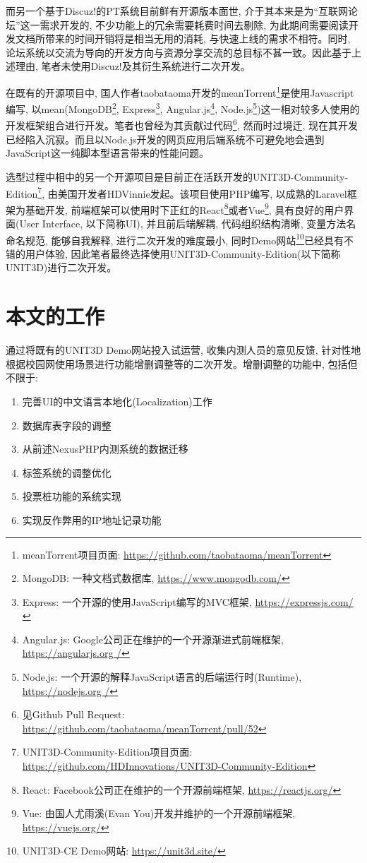而另一个基于Discuz!的PT系统目前鲜有开源版本面世, 介于其本来是为``互联网论坛''这一需求开发的, 不少功能上的冗余需要耗费时间去剔除, 为此期间需要阅读开发文档所带来的时间开销将是相当无用的消耗, 与快速上线的需求不相符。同时, 论坛系统以交流为导向的开发方向与资源分享交流的总目标不甚一致。因此基于上述理由, 笔者未使用Discuz!及其衍生系统进行二次开发。

在既有的开源项目中, 国人作者taobataoma开发的meanTorrent\footnote{meanTorrent项目页面: \url{https://github.com/taobataoma/meanTorrent}}是使用Javascript编写, 以mean(MongoDB\footnote{MongoDB: 一种文档式数据库, \url{https://www.mongodb.com/}}, Express\footnote{Express: 一个开源的使用JavaScript编写的MVC框架, \url{https://expressjs.com/}}, Angular.js\footnote{Angular.js: Google公司正在维护的一个开源渐进式前端框架, \url{https://angularjs.org
/}}, Node.js\footnote{Node.js: 一个开源的解释JavaScript语言的后端运行时(Runtime), \url{https://nodejs.org
/}})这一相对较多人使用的开发框架组合进行开发。笔者也曾经为其贡献过代码\footnote{见Github Pull Request: \url{https://github.com/taobataoma/meanTorrent/pull/52}}, 然而时过境迁, 现在其开发已经陷入沉寂。而且以Node.js开发的网页应用后端系统不可避免地会遇到JavaScript这一纯脚本型语言带来的性能问题。

选型过程中相中的另一个开源项目是目前正在活跃开发的UNIT3D-Community-Edition\footnote{UNIT3D-Community-Edition项目页面: \url{https://github.com/HDInnovations/UNIT3D-Community-Edition}}, 由美国开发者HDVinnie发起。该项目使用PHP编写, 以成熟的Laravel框架为基础开发, 前端框架可以使用时下正红的React\footnote{React: Facebook公司正在维护的一个开源前端框架, \url{https://reactjs.org/}}或者Vue\footnote{Vue: 由国人尤雨溪(Evan You)开发并维护的一个开源前端框架, \url{https://vuejs.org/}
}, 具有良好的用户界面(User Interface, 以下简称UI), 并且前后端解耦, 代码组织结构清晰, 变量方法名命名规范, 能够自我解释, 进行二次开发的难度最小, 同时Demo网站\footnote{UNIT3D-CE Demo网站: \url{https://unit3d.site/}}已经具有不错的用户体验, 因此笔者最终选择使用UNIT3D-Community-Edition(以下简称UNIT3D)进行二次开发。

\section{本文的工作}

通过将既有的UNIT3D Demo网站投入试运营, 收集内测人员的意见反馈, 针对性地根据校园网使用场景进行功能增删调整等的二次开发。增删调整的功能中, 包括但不限于:

\begin{enumerate}[label=(\arabic*),leftmargin=*]
\item 完善UI的中文语言本地化(Localization)工作
\item 数据库表字段的调整
\item 从前述NexusPHP内测系统的数据迁移
\item 标签系统的调整优化
\item 投票桩功能的系统实现
\item 实现反作弊用的IP地址记录功能
\end{enumerate}


